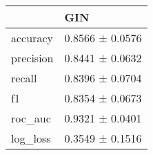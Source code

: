 \begin{tabular}{ll}
\toprule
 & GIN \\
\midrule
accuracy & 0.8566 ± 0.0576 \\
precision & 0.8441 ± 0.0632 \\
recall & 0.8396 ± 0.0704 \\
f1 & 0.8354 ± 0.0673 \\
roc_auc & 0.9321 ± 0.0401 \\
log_loss & 0.3549 ± 0.1516 \\
\bottomrule
\end{tabular}
